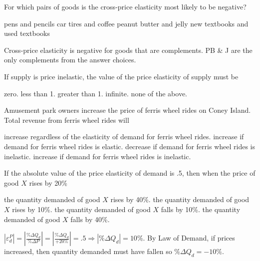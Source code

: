 \documentclass[addpoints,11pt]{exam}
\theoremstyle{definition}
\begin{document}
\begin{questions}
\question For which pairs of goods is the cross-price elasticity most likely to be negative?

	\begin{choices}
		\choice pens and pencils
		\choice car tires and coffee
		\CorrectChoice peanut butter and jelly
		\choice new textbooks and used textbooks
	\end{choices}
	
	
	\begin{solution}
		Cross-price elasticity is negative for goods that are complements. PB \& J are the only complements from the answer choices.
	\end{solution}
	
\question If supply is price inelastic, the value of the price elasticity of supply must be 

\begin{choices}
	\choice zero.
	\CorrectChoice less than 1.
	\choice greater than 1.
	\choice infinite.
	\choice none of the above.
\end{choices}
	
\question Amusement park owners increase the price of ferris wheel rides on Coney Island. Total revenue from ferris wheel rides will 

\begin{choices}
	\choice increase regardless of the elasticity of demand for ferris wheel rides.
	\choice increase if demand for ferris wheel rides is elastic.
	\choice decrease if demand for ferris wheel rides is inelastic.
	\CorrectChoice increase if demand for ferris wheel rides is inelastic.
\end{choices}

\question If the absolute value of the price elasticity of demand is .5, then when the price of good $X$ rises by 20\%

	\begin{choices}
		\choice the quantity demanded of good $X$ rises by 40\%.
		\choice the quantity demanded of good $X$ rises by 10\%.
		\CorrectChoice the quantity demanded of good $X$ falls by 10\%.
		\choice the quantity demanded of good $X$ falls by 40\%.
	\end{choices}

	
	\begin{solution}
		$|\varepsilon_d^P| = |\frac{\%\Delta Q_{d}}{\%\Delta P}| = |\frac{\%\Delta Q_{d}}{+20\%}| = .5 \Rightarrow |\%\Delta Q_{d}| = 10\%.$ By Law of Demand, if prices increased, then quantity demanded must have fallen so $\%\Delta Q_{d} = -10\%$.
	\end{solution}
	

\end{questions}
\end{document}
